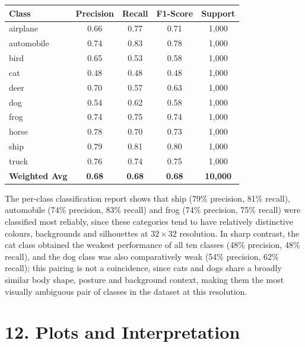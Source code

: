 \documentclass[11pt,a4paper]{article}
\begin{document}
\vspace{0.15cm}

\begin{center}
\begin{tabular}{|p{3cm}|c|c|c|c|}
\hline
\textbf{Class} & \textbf{Precision} & \textbf{Recall} & \textbf{F1-Score} & \textbf{Support}\\
\hline
airplane & 0.66 & 0.77 & 0.71 & 1{,}000\\
\hline
automobile & 0.74 & 0.83 & 0.78 & 1{,}000\\
\hline
bird & 0.65 & 0.53 & 0.58 & 1{,}000\\
\hline
cat & 0.48 & 0.48 & 0.48 & 1{,}000\\
\hline
deer & 0.70 & 0.57 & 0.63 & 1{,}000\\
\hline
dog & 0.54 & 0.62 & 0.58 & 1{,}000\\
\hline
frog & 0.74 & 0.75 & 0.74 & 1{,}000\\
\hline
horse & 0.78 & 0.70 & 0.73 & 1{,}000\\
\hline
ship & 0.79 & 0.81 & 0.80 & 1{,}000\\
\hline
truck & 0.76 & 0.74 & 0.75 & 1{,}000\\
\hline
\textbf{Weighted Avg} & \textbf{0.68} & \textbf{0.68} & \textbf{0.68} & \textbf{10{,}000}\\
\hline
\end{tabular}
\end{center}

\vspace{0.15cm}

The per-class classification report shows that ship (79\% precision, 81\% recall), automobile (74\% precision, 83\% recall) and frog (74\% precision, 75\% recall) were classified most reliably, since these categories tend to have relatively distinctive colours, backgrounds and silhouettes at $32\times32$ resolution. In sharp contrast, the cat class obtained the weakest performance of all ten classes (48\% precision, 48\% recall), and the dog class was also comparatively weak (54\% precision, 62\% recall); this pairing is not a coincidence, since cats and dogs share a broadly similar body shape, posture and background context, making them the most visually ambiguous pair of classes in the dataset at this resolution.

\section*{12. Plots and Interpretation}
\end{document}
